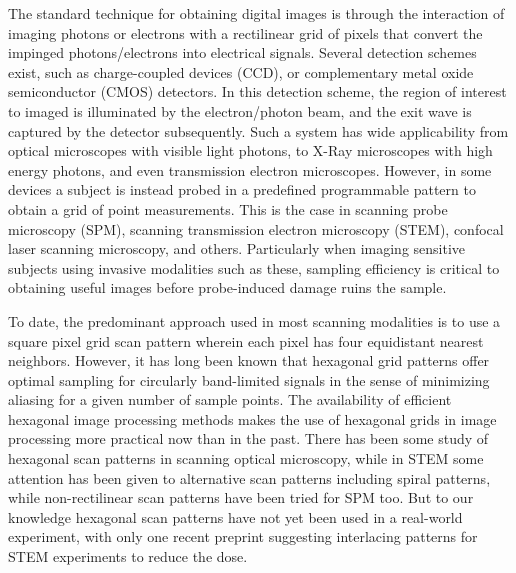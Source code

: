 \documentclass[aip, amsmath, amssymb, nobibnotes, nofootinbib, citeautoscript, reprint, superscriptaddress]{revtex4-2}
\begin{document}
    The standard technique for obtaining digital images is through the interaction of imaging photons or electrons with a rectilinear grid of pixels that convert the impinged photons/electrons into electrical signals.
    Several detection schemes exist, such as charge-coupled devices (CCD), or complementary metal oxide semiconductor (CMOS) detectors\cite{electron_detectors_review, ccd_cmos_review}.
    In this detection scheme, the region of interest to imaged is illuminated by the electron/photon beam, and the exit wave is captured by the detector subsequently.
    Such a system has wide applicability from optical microscopes with visible light photons, to X-Ray microscopes with high energy photons, and even transmission electron microscopes.
    However, in some devices a subject is instead probed in a predefined programmable pattern to obtain a grid of point measurements.
    This is the case in scanning probe microscopy (SPM), scanning transmission electron microscopy (STEM), confocal laser scanning microscopy, and others.
    Particularly when imaging sensitive subjects using invasive modalities such as these, sampling efficiency is critical to obtaining useful images before probe-induced damage ruins the sample.


    To date, the predominant approach used in most scanning modalities is to use a square pixel grid scan pattern wherein each pixel has four equidistant nearest neighbors.
    However, it has long been known that hexagonal grid patterns offer optimal sampling for circularly band-limited signals in the sense of minimizing aliasing for a given number of sample points\cite{petersen1962}.
    The availability of efficient hexagonal image processing methods makes the use of hexagonal grids in image processing more practical now than in the past\cite{hex_fft, middleton2006hexagonal}.
    There has been some study of hexagonal scan patterns in scanning optical microscopy\cite{heintzmann2007}, while in STEM some attention has been given to alternative scan patterns including spiral patterns\cite{spiral_scans}, while non-rectilinear scan patterns have been tried for SPM too\cite{non_gridded_spm}. 
    But to our knowledge hexagonal scan patterns have not yet been used in a real-world experiment, with only one recent preprint suggesting interlacing patterns for STEM experiments to reduce the dose\cite{interlacing}.  
\end{document}
